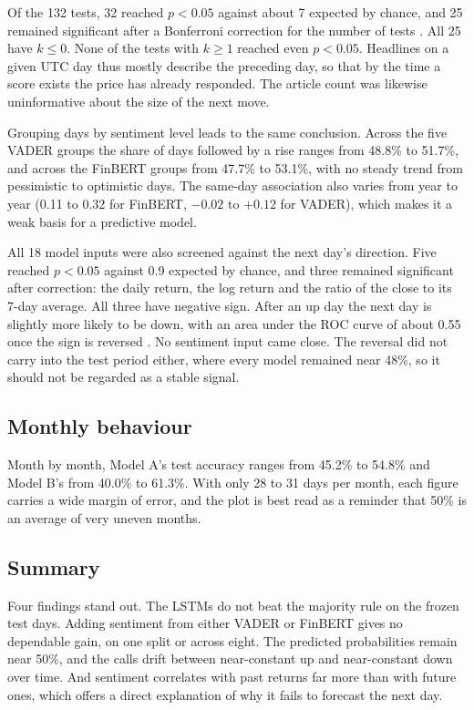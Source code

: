 Of the 132 tests, 32 reached $p<0.05$ against about 7 expected by chance, and 25 remained significant after a Bonferroni correction for the number of tests \cite{dunn1961}. All 25 have $k\leq0$. None of the tests with $k\geq1$ reached even $p<0.05$. Headlines on a given UTC day thus mostly describe the preceding day, so that by the time a score exists the price has already responded. The article count was likewise uninformative about the size of the next move.

Grouping days by sentiment level leads to the same conclusion. Across the five VADER groups the share of days followed by a rise ranges from 48.8\% to 51.7\%, and across the FinBERT groups from 47.7\% to 53.1\%, with no steady trend from pessimistic to optimistic days. The same-day association also varies from year to year (0.11 to 0.32 for FinBERT, $-0.02$ to $+0.12$ for VADER), which makes it a weak basis for a predictive model.

All 18 model inputs were also screened against the next day's direction. Five reached $p<0.05$ against 0.9 expected by chance, and three remained significant after correction: the daily return, the log return and the ratio of the close to its 7-day average. All three have negative sign. After an up day the next day is slightly more likely to be down, with an area under the ROC curve of about 0.55 once the sign is reversed \cite{fawcett2006}. No sentiment input came close. The reversal did not carry into the test period either, where every model remained near 48\%, so it should not be regarded as a stable signal.

\subsection{Monthly behaviour}
Month by month, Model A's test accuracy ranges from 45.2\% to 54.8\% and Model B's from 40.0\% to 61.3\%. With only 28 to 31 days per month, each figure carries a wide margin of error, and the plot is best read as a reminder that 50\% is an average of very uneven months.


\subsection{Summary}
Four findings stand out. The LSTMs do not beat the majority rule on the frozen test days. Adding sentiment from either VADER or FinBERT gives no dependable gain, on one split or across eight. The predicted probabilities remain near 50\%, and the calls drift between near-constant up and near-constant down over time. And sentiment correlates with past returns far more than with future ones, which offers a direct explanation of why it fails to forecast the next day.
